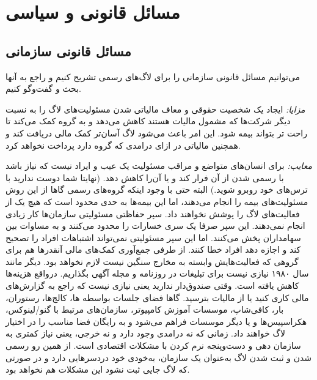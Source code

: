 \section{مسائل قانونی و سیاسی}

\subsection{مسائل قانونی سازمانی}

می‌توانیم مسائل قانونی سازمانی را برای لاگ‌های رسمی تشریح کنیم و راجع
به آنها بحث و گفت‌وگو کنیم.

{\itshape مزایا:}
ایجاد یک شخصیت حقوقی و معاف مالیاتی شدن مسئولیت‌های لاگ
را به نسبت دیگر شرکت‌ها که مشمول مالیات هستند کاهش می‌دهد و به گروه
کمک می‌کند تا راحت تر بتواند بیمه شود. این امر باعث می‌شود لاگ آسان‌تر
کمک مالی دریافت کند و همچنین مالیاتی در ازای درامدی که گروه دارد
پرداخت نخواهد کرد.

{\itshape معایب:}
برای انسان‌های متواضع و مراقب مسئولیت یک عیب و ایراد نیست که نیاز باشد
با رسمی شدن از آن فرار کند و یا آن‌را کاهش دهد.
(نهایتا شما دوست ندارید با ترس‌های خود روبرو شوید.)
البته حتی با وجود اینکه گروه‌های رسمی گاها از این روش مسئولیت‌های بیمه
را انجام می‌دهند، اما این بیمه‌ها به حدی محدود است که هیچ یک از فعالیت‌های
لاگ را پوشش نخواهند داد.
سپر حفاظتی مسئولیتی سازمان‌ها کار زیادی انجام نمی‌دهند. این سپر صرفا
یک سری خسارات را محدود می‌کنند و به مساوات بین سهامداران پخش می‌کنند.
اما این سپر مسئولیتی نمی‌تواند اشتباهات افراد را تصحیح کند و اجازه دهد
افراد خطا کنند.
از طرفی جمع‌آوری کمک‌های مالی آنقدر‌ها هم برای گروهی که فعالیت‌هایش وابسته به
مخارج سنگین نیست لازم نخواهد بود. دیگر مانند سال ۱۹۸۰ نیازی نیست برای تبلیغات
در روزنامه و مجله آگهی بگذاریم. درواقع هزینه‌ها کاهش یافته است.
وقتی صندوق‌دار ندارید یعنی نیازی نیست که راجع به گزارش‌های مالی کاری کنید یا
از مالیات بترسید.
گاها فضای جلسات بواسطه ‌ها، کالج‌ها، رستوران، بار، کافی‌شاپ، موسسات آموزش کامپیوتر،
سازمان‌های مرتبط با گنو/لینوکس، هکراسپیس‌ها و یا دیگر موسسات فراهم می‌شود و به رایگان
فضا مناسب را در اختیار لاگ خواهند داد.
زمانی که نه درامدی وجود دارد و نه خرجی، یعنی نیاز کمتری به سازمان دهی و دست‌وپنجه
نرم کردن با مشکلات اقتصادی است.
از همین رو رسمی شدن و ثبت شدن لاگ به‌عنوان یک سازمان، به‌خودی خود دردسر‌هایی دارد
و در صورتی که لاگ جایی ثبت نشود این مشکلات هم نخواهد بود.


